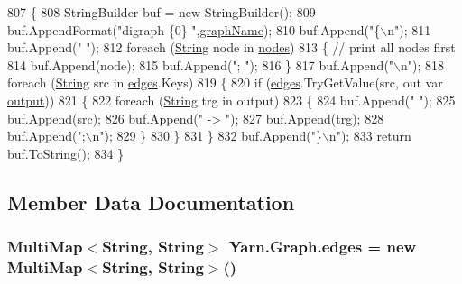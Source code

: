 \begin{DoxyCode}
807         \{
808             StringBuilder buf = \textcolor{keyword}{new} StringBuilder();
809             buf.AppendFormat(\textcolor{stringliteral}{"digraph \{0\} "},\hyperlink{a00102_a8605f1ec5a4e9cfd07d3ac2be042dac6}{graphName});
810             buf.Append(\textcolor{stringliteral}{"\{\(\backslash\)n"});
811             buf.Append(\textcolor{stringliteral}{"  "});
812             \textcolor{keywordflow}{foreach} (\hyperlink{a00045_a301aa7c866593a5b625a8fc158bbeacea27118326006d3829667a400ad23d5d98}{String} node \textcolor{keywordflow}{in} \hyperlink{a00102_a506df6f737a41748c01239bdea5d82b1}{nodes})
813             \{ \textcolor{comment}{// print all nodes first}
814                 buf.Append(node);
815                 buf.Append(\textcolor{stringliteral}{"; "});
816             \}
817             buf.Append(\textcolor{stringliteral}{"\(\backslash\)n"});
818             \textcolor{keywordflow}{foreach} (\hyperlink{a00045_a301aa7c866593a5b625a8fc158bbeacea27118326006d3829667a400ad23d5d98}{String} src \textcolor{keywordflow}{in} \hyperlink{a00102_a8adf7c937ab5c584b49698283e3da150}{edges}.Keys)
819             \{
820                 \textcolor{keywordflow}{if} (\hyperlink{a00102_a8adf7c937ab5c584b49698283e3da150}{edges}.TryGetValue(src, out var \hyperlink{a00336_a3da6d48778c7b08a040bf24377f67792}{output}))
821                 \{
822                     \textcolor{keywordflow}{foreach} (\hyperlink{a00045_a301aa7c866593a5b625a8fc158bbeacea27118326006d3829667a400ad23d5d98}{String} trg \textcolor{keywordflow}{in} output)
823                     \{
824                         buf.Append(\textcolor{stringliteral}{"  "});
825                         buf.Append(src);
826                         buf.Append(\textcolor{stringliteral}{" -> "});
827                         buf.Append(trg);
828                         buf.Append(\textcolor{stringliteral}{";\(\backslash\)n"});
829                     \}
830                 \}
831             \}
832             buf.Append(\textcolor{stringliteral}{"\}\(\backslash\)n"});
833             \textcolor{keywordflow}{return} buf.ToString();
834         \}
\end{DoxyCode}


\subsection{Member Data Documentation}
\hypertarget{a00102_a8adf7c937ab5c584b49698283e3da150}{
\subsubsection[{edges}]{\setlength{\rightskip}{0pt plus 5cm}Multi\-Map$<${\bf String}, {\bf String}$>$ Yarn.\-Graph.\-edges = new Multi\-Map$<${\bf String}, {\bf String}$>$()}}\label{a00102_a8adf7c937ab5c584b49698283e3da150}


